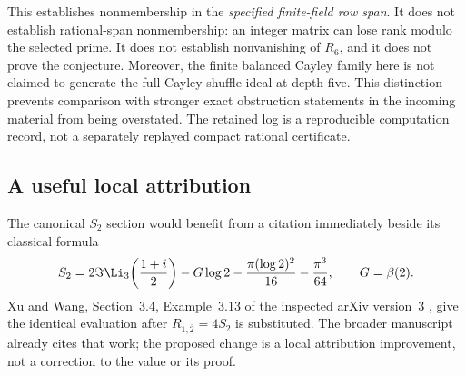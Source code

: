This establishes nonmembership in the \emph{specified finite-field
row span}.  It does not establish rational-span nonmembership:
an integer matrix can lose rank modulo the selected prime.
It does not establish nonvanishing of $R_6$, and it does not prove
the conjecture.  Moreover, the finite balanced Cayley family here
is not claimed to generate the full Cayley shuffle ideal at depth
five.  This distinction prevents comparison with stronger exact
obstruction statements in the incoming material from being
overstated.  The retained log is a reproducible computation record,
not a separately replayed compact rational certificate.

\subsection{A useful local attribution}

The canonical $S_2$ section would benefit from a citation immediately
beside its classical formula
\begin{equation}
 S_2=2\Im\Li_3\!\left(\frac{1+i}{2}\right)
       -G\log2-\frac{\pi(\log2)^2}{16}-\frac{\pi^3}{64},
 \qquad G=\beta(2).
 \label{eq:S2attribution}
\end{equation}
Xu and Wang, Section~3.4, Example~3.13 of the inspected arXiv
version~3 \cite{XuWang}, give the identical evaluation after
$R_{1,\bar2}=4S_2$ is substituted.  The broader manuscript already
cites that work; the proposed change is a local attribution
improvement, not a correction to the value or its proof.


